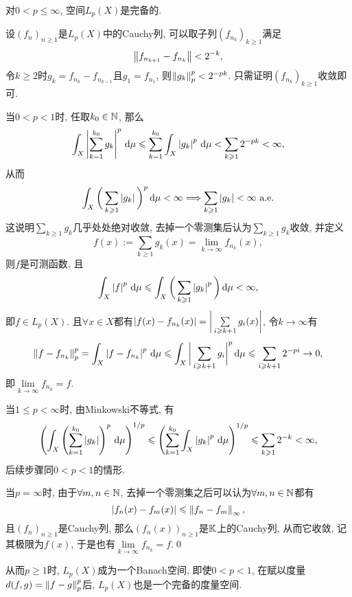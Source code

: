 	\begin{Theorem}
	对$ 0<p\leqslant\infty $, 空间$ L_p(X) $是完备的.
	\end{Theorem}
	\begin{Proof}
	设$ (f_n)_{n\geqslant 1} $是$ L_p(X) $中的Cauchy列, 可以取子列$ (f_{n_k})_{k\geqslant 1} $满足
	\[
	\left\| f_{n_{k+1}}-f_{n_k} \right\|<2^{-k},
	\]
	令$ k\geqslant 2 $时$ g_k=f_{n_k}-f_{n_{k-1}} $且$ g_1=f_{n_1} $, 则$ \left\| g_k \right\|_p^p<2^{-pk} $. 只需证明$ (f_{n_k})_{k\geqslant 1} $收敛即可.
	
	当$ 0<p<1 $时, 任取$ k_0\in\mathbb{N} $, 那么
	\[
	\int_X\left| \sum_{k=1}^{k_0}g_k \right| ^p\,\mathrm{d}\mu\leqslant\sum_{k=1}^{k_0}\int_X\left| g_k \right| ^p\,\mathrm{d}\mu<\sum_{k\geqslant 1}2^{-pk}<\infty,
	\]
	从而
	\[
	\int_X\bigg(\sum_{k\geqslant 1}\left| g_k \right| \bigg)^p\,\mathrm{d}\mu<\infty\Longrightarrow\sum_{k\geqslant 1}\left| g_k \right| <\infty\ \text{a.e.}
	\]
	这说明$ \sum\limits_{k\geqslant 1}g_k $几乎处处绝对收敛, 去掉一个零测集后认为$ \sum\limits_{k\geqslant 1}g_{k} $收敛, 并定义
	\[
	f(x):=\sum_{k\geqslant 1}g_k(x)=\lim_{k\to\infty}f_{n_k}(x),
	\]
	则$ f $是可测函数, 且
	\[
	\int_X\left| f \right| ^p\,\mathrm{d}\mu\leqslant\int_X\bigg(\sum_{k\geqslant 1}\left| g_k \right| ^p\bigg)\,\mathrm{d} \mu<\infty,
	\]
	即$ f\in L_p(X) $. 且$ \forall x\in X $都有$ \left| f(x)-f_{n_k}(x) \right| =\bigg|\sum\limits_{i\geqslant k+1}g_i(x)\bigg| $, 令$ k\to\infty $有
	\[
	\left\| f-f_{n_k} \right\|_p^p=\int_X\left| f-f_{n_k} \right| ^p\,\mathrm{d}\mu\leqslant\int_X\bigg|\sum_{i\geqslant k+1}g_i\bigg|^p\,\mathrm{d}\mu\leqslant\sum_{i\geqslant k+1}2^{-pi}\to 0,
	\]
	即$ \lim\limits_{k\to\infty}f_{n_{k}}=f $.
	
	当$ 1\leqslant p<\infty $时, 由Minkowski不等式, 有
	\[
	\left( \int_X\left( \sum_{k=1}^{k_0}\left| g_k \right|  \right)^p\,\mathrm{d}\mu \right)^{1/p}\leqslant\left( \sum_{k=1}^{k_0}\int_X\left| g_k \right| ^p\,\mathrm{d}\mu \right)^{1/p}\leqslant\sum_{k\geqslant 1}2^{-k}<\infty,
	\]
	后续步骤同$ 0<p<1 $的情形.
	
	当$ p=\infty $时, 由于$ \forall m,n\in\mathbb{N} $, 去掉一个零测集之后可以认为$ \forall m,n\in\mathbb{N} $都有
	\[
	\left| f_n(x)-f_m(x) \right| \leqslant\left\| f_n-f_m \right\|_\infty,
	\]
	且$ (f_n)_{n\geqslant 1} $是Cauchy列, 那么$ (f_n(x))_{n\geqslant 1} $是$ \mathbb{K} $上的Cauchy列, 从而它收敛, 记其极限为$ f(x) $, 于是也有$ \lim\limits_{k\to\infty}f_{n_k}=f $.\qed
	\end{Proof}
	
	从而$ p\geqslant 1 $时, $ L_p(X) $成为一个Banach空间, 即使$ 0<p<1 $, 在赋以度量$ d(f,g)=\left\| f-g \right\|_p^p $后, $ L_p(X) $也是一个完备的度量空间.